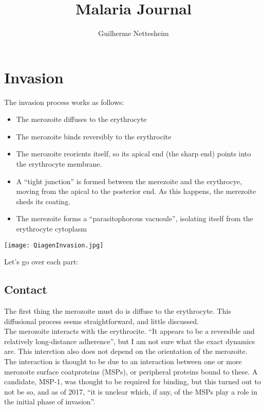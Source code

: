 \documentclass{article}
\author{Guilherme Nettesheim}
\title{Malaria Journal}
\begin{document}
\maketitle


\section{Invasion}

The invasion process works as follows:

\begin{itemize}
	\item The merozoite diffuses to the erythrocyte
	\item The merozoite binds reversibly to the erythrocite
	\item The merozoite reorients itself, so its apical end (the sharp end) points into the erythrocyte membrane.
	\item A ``tight junction'' is formed between the merezoite and the erythrocye, moving from the apical to the posterior end. As this happens, the merezoite sheds its coating.
	\item The merezoite forms a ``parasitophorous vacuoule'', isolating itself from the erythrocyte cytoplasm
\end{itemize}

\texttt{[image: QiagenInvasion.jpg]}

Let's go over each part:

\subsection{Contact}

The first thing the merozoite must do is diffuse to the erythrocyte. This diffusional process seems straightforward, and little discussed.\\

The merozoite interacts with the erythrocite. ``It appears to be a reversible and relatively long-distance adherence''\cite{Crick2014a}, but I am not sure what the exact dynamics are. This interction also does not depend on the orientation of the merozoite.\\

The interaction is thought to be due to an interaction between one or more merozoite surface coatproteins (MSPs), or peripheral proteins bound to these. A candidate, MSP-1, was thought to be required for binding, but this turned out to not be so, and as of 2017, ``it is unclear which, if any, of the MSPs play a role in the initial phase of invasion''\cite{Cowman2017}.\\
\end{document}

